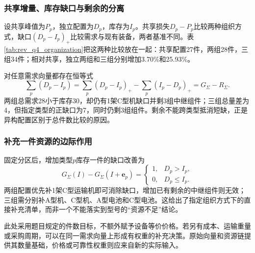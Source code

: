 \subsubsection{共享增量、库存缺口与剩余的分离}
设共享峰值为$P_p$，独立配置为$D_p$，库存为$I_p$。共享损失$D_p-P_p$比较两种组织方式，缺口$(D_p-I_p)_+$比较需求与现有装备，两者基准不同。表\ref{tab:rev_q4_organization}把这两种比较放在一起：共享配置27件，两组28件，三组34件；相对共享，独立两组和三组分别增加3.70\%和25.93\%。


对任意需求向量都存在恒等式
\begin{equation}
 \sum_p(D_p-I_p)=\sum_p(D_p-I_p)_+-\sum_p(I_p-D_p)_+=G_\Sigma-R_\Sigma.
 \label{eq:q4_gap_balance}
\end{equation}
两组总需求28小于库存30，却仍有1架C型机缺口并剩3组中继组件；三组总量差为4，但指定类型的正缺口为7，同时仍剩3组组件。剩余不能跨类型抵消短缺，正是异构配置区别于总件数比较的原因。

\subsubsection{补充一件资源的边际作用}
固定分区后，增加类型$p$库存一件的缺口改善为
\begin{equation}
 G_\Sigma(I)-G_\Sigma(I+\boldsymbol e_p)=
 \begin{cases}1,&D_p>I_p,\\0,&D_p\le I_p.\end{cases}
 \label{eq:q4_marginal_stock}
\end{equation}
两组配置优先补1架C型运输机即可消除缺口，增加已有剩余的中继组件则无效；三组需分别补A型机、C型机、A型电池和C型电池。这给出了指定组织方式下的直接补充清单，而非一个不能落实到型号的“资源不足”结论。

此处采用题目规定的件数目标，不额外赋予设备等价价格。若另有成本、运输重量或采购周期，可以在同一需求向量上形成有权重的补充决策。原始向量和资源链提供其数量基础，价格或可靠性权重则应来自新的实际输入。
